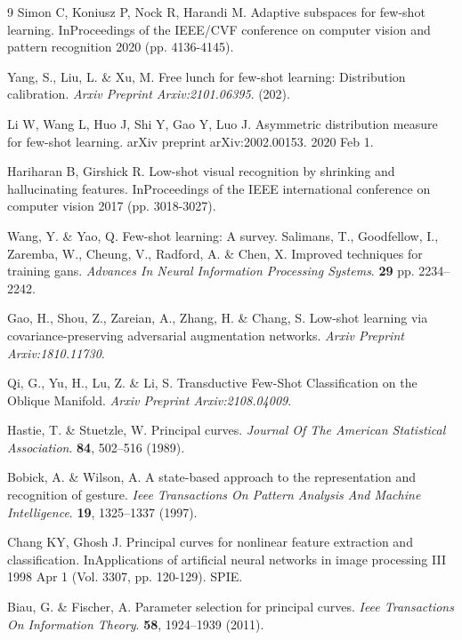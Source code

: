 \documentclass{article}
\begin{document}
\begin{thebibliography}{9}
Simon C, Koniusz P, Nock R, Harandi M. Adaptive subspaces for few-shot learning. InProceedings of the IEEE/CVF conference on computer vision and pattern recognition 2020 (pp. 4136-4145).

Yang, S., Liu, L. \& Xu, M. Free lunch for few-shot learning: Distribution calibration. 
{\em Arxiv Preprint Arxiv:2101.06395}.
 (202).
 
Li W, Wang L, Huo J, Shi Y, Gao Y, Luo J. Asymmetric distribution measure for few-shot learning. arXiv preprint arXiv:2002.00153. 2020 Feb 1.

Hariharan B, Girshick R. Low-shot visual recognition by shrinking and hallucinating features. InProceedings of the IEEE international conference on computer vision 2017 (pp. 3018-3027).

Wang, Y. \& Yao, Q. Few-shot learning: A survey. 
Salimans, T., Goodfellow, I., Zaremba, W., Cheung, V., Radford, A. \& Chen, X. Improved techniques for training gans. 
{\em Advances In Neural Information Processing Systems}.
 \textbf{29} pp. 2234--2242.
 
Gao, H., Shou, Z., Zareian, A., Zhang, H. \& Chang, S. Low-shot learning via covariance-preserving adversarial augmentation networks. 
{\em Arxiv Preprint Arxiv:1810.11730}.
 
Qi, G., Yu, H., Lu, Z. \& Li, S. Transductive Few-Shot Classification on the Oblique Manifold. 
{\em Arxiv Preprint Arxiv:2108.04009}.

Hastie, T. \& Stuetzle, W. Principal curves. 
{\em Journal Of The American Statistical Association}.
 \textbf{84}, 502--516 (1989).
 
Bobick, A. \& Wilson, A. A state-based approach to the representation and recognition of gesture. 
{\em Ieee Transactions On Pattern Analysis And Machine Intelligence}.
 \textbf{19}, 1325--1337 (1997).
 
Chang KY, Ghosh J. Principal curves for nonlinear feature extraction and classification. InApplications of artificial neural networks in image processing III 1998 Apr 1 (Vol. 3307, pp. 120-129). SPIE.

Biau, G. \& Fischer, A. Parameter selection for principal curves. 
{\em Ieee Transactions On Information Theory}.
 \textbf{58}, 1924--1939 (2011).
 

\end{thebibliography}
\end{document}
